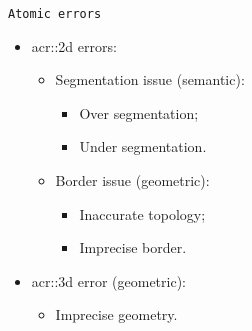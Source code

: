 \documentclass[10pt]{beamer}
\begin{document}
            \begin{frame}{\texttt{Atomic errors}}
                \begin{itemize}[label=\(\blacktriangleright\), font=\color{IGNGreen}, itemsep=2em]
                    \item<1-> \Acrfull{acr::2d} errors:
                        \begin{itemize}[label=\(\blacktriangleright\), font=\color{IGNGreen}]
                            \item<2-> Segmentation issue (semantic):
                                \begin{itemize}
                                    \item<3-> Over segmentation;
                                    \item<4-> Under segmentation.      
                                \end{itemize}
                            \item<5-> Border issue (geometric):
                            \begin{itemize}
                                \item<6-> Inaccurate topology;
                                \item<7-> Imprecise border.      
                            \end{itemize}
                        \end{itemize}
                    \item<8-> \gls{acr::3d} error (geometric):
                        \begin{itemize}[label=\(\blacktriangleright\), font=\color{IGNGreen}]
                            \item<9-> Imprecise geometry.
                        \end{itemize}
                \end{itemize}
            \end{frame}
\end{document}
